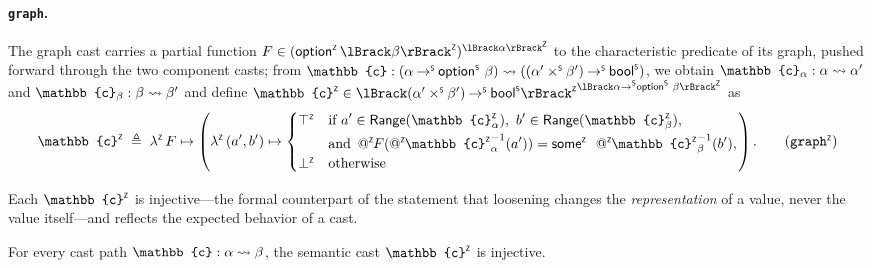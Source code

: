 \paragraph{\texttt{graph}.} The graph cast carries a partial function $F \in (\optZ\,\interpZ{\beta})^{\interpZ{\alpha}}$ to the characteristic predicate of its graph, pushed forward through the two component casts; from \(\mathbb{c} : \castpath{(\alpha \toS \optS\,\beta)}{((\alpha' \timesS \beta') \toS \boolS)}\), we obtain \(\mathbb{c}_\alpha : \castpath{\alpha}{\alpha'}\) and \(\mathbb{c}_\beta : \castpath{\beta}{\beta'}\) and define \(\zop{\mathbb{c}} \in {\interpZ{(\alpha' \timesS \beta') \toS \boolS}}^{\interpZ{\alpha \toS \optS\,\beta}}\) as
\begin{equation}
  \label{eq:castZF-graph}
  \zop{\mathbb{c}} \;\triangleq\;
  \lamZ\,F \mapsto \left(\lamZ\,(a',b') \mapsto
  \begin{cases}
    \topZ & \begin{aligned}[t]&\text{if } a' \in \Ran(\zop{\mathbb{c}}_\alpha),\ b' \in \Ran(\zop{\mathbb{c}}_\beta),\\ &\text{and } \appZ F(\appZ{\zop{\mathbb{c}}}_\alpha^{-1}(a')) = \someZ\ \appZ{\zop{\mathbb{c}}}_\beta^{-1}(b'),\end{aligned}\\
    \botZ & \text{otherwise}
  \end{cases}\right).
\tag{$\zop{\mathtt{graph}}$}
\end{equation}

Each $\zop{\mathbb{c}}$ is injective---the formal counterpart of the statement that loosening changes the \emph{representation} of a value, never the value itself---and reflects the expected behavior of a cast.

\begin{lemma}
\label{lem:semantic-cast-injective}
For every cast path $\mathbb{c} : \castpath{\alpha}{\beta}$, the semantic cast $\zop{\mathbb{c}}$ is injective.
\end{lemma}

